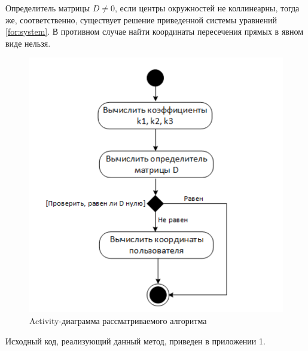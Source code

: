 Определитель матрицы $D \neq 0$, если центры окружностей не коллинеарны, тогда же, соответственно, существует решение приведенной системы уравнений \ref{for:system}. В противном случае найти координаты пересечения прямых в явном виде нельзя.

\begin{figure}[ht]
    \centering
    \includegraphics[scale=0.5]{img/powerCenterActivity}
    \caption{Activity-диаграмма рассматриваемого алгоритма}
\end{figure}

Исходный код, реализующий данный метод, приведен в приложении 1.